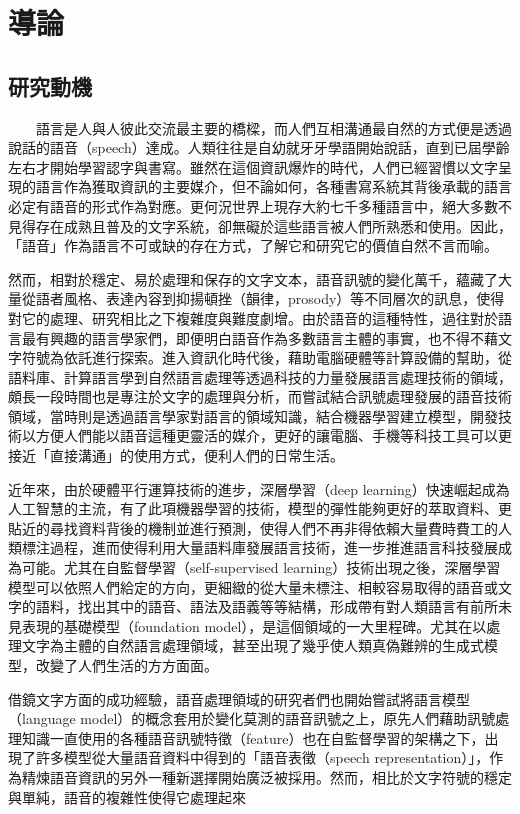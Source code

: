 \chapter{導論}
\section{研究動機}  %

　　語言是人與人彼此交流最主要的橋樑，而人們互相溝通最自然的方式便是透過說話的語音（speech）達成。人類往往是自幼就牙牙學語開始說話，直到已屆學齡左右才開始學習認字與書寫。雖然在這個資訊爆炸的時代，人們已經習慣以文字呈現的語言作為獲取資訊的主要媒介，但不論如何，各種書寫系統其背後承載的語言必定有語音的形式作為對應。更何況世界上現存大約七千多種語言中，絕大多數不見得存在成熟且普及的文字系統，卻無礙於這些語言被人們所熟悉和使用。因此，「語音」作為語言不可或缺的存在方式，了解它和研究它的價值自然不言而喻。

    然而，相對於穩定、易於處理和保存的文字文本，語音訊號的變化萬千，蘊藏了大量從語者風格、表達內容到抑揚頓挫（韻律，prosody）等不同層次的訊息，使得對它的處理、研究相比之下複雜度與難度劇增。由於語音的這種特性，過往對於語言最有興趣的語言學家們，即便明白語音作為多數語言主體的事實，也不得不藉文字符號為依託進行探索。進入資訊化時代後，藉助電腦硬體等計算設備的幫助，從語料庫、計算語言學到自然語言處理等透過科技的力量發展語言處理技術的領域，頗長一段時間也是專注於文字的處理與分析，而嘗試結合訊號處理發展的語音技術領域，當時則是透過語言學家對語言的領域知識，結合機器學習建立模型，開發技術以方便人們能以語音這種更靈活的媒介，更好的讓電腦、手機等科技工具可以更接近「直接溝通」的使用方式，便利人們的日常生活。

    近年來，由於硬體平行運算技術的進步，深層學習（deep learning）快速崛起成為人工智慧的主流，有了此項機器學習的技術，模型的彈性能夠更好的萃取資料、更貼近的尋找資料背後的機制並進行預測，使得人們不再非得依賴大量費時費工的人類標注過程，進而使得利用大量語料庫發展語言技術，進一步推進語言科技發展成為可能。尤其在自監督學習（self-supervised learning）技術出現之後，深層學習模型可以依照人們給定的方向，更細緻的從大量未標注、相較容易取得的語音或文字的語料，找出其中的語音、語法及語義等等結構，形成帶有對人類語言有前所未見表現的基礎模型（foundation model），是這個領域的一大里程碑。尤其在以處理文字為主體的自然語言處理領域，甚至出現了幾乎使人類真偽難辨的生成式模型，改變了人們生活的方方面面。

    借鏡文字方面的成功經驗，語音處理領域的研究者們也開始嘗試將語言模型（language model）的概念套用於變化莫測的語音訊號之上，原先人們藉助訊號處理知識一直使用的各種語音訊號特徵（feature）也在自監督學習的架構之下，出現了許多模型從大量語音資料中得到的「語音表徵（speech representation）」，作為精煉語音資訊的另外一種新選擇開始廣泛被採用。然而，相比於文字符號的穩定與單純，語音的複雜性使得它處理起來
    
